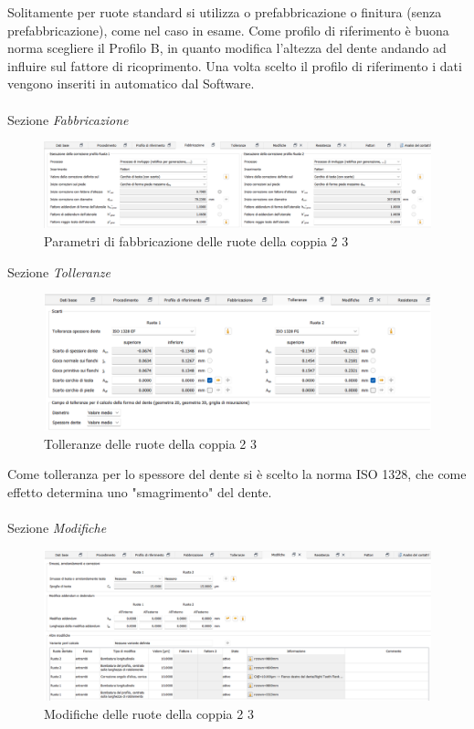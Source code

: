 Solitamente per ruote standard si utilizza o prefabbricazione o finitura (senza prefabbricazione), come nel caso in esame. Come profilo di riferimento è buona norma scegliere il Profilo B, in quanto modifica l’altezza del dente andando ad influire sul fattore di ricoprimento. Una volta scelto il profilo di riferimento i dati vengono inseriti in automatico dal Software.\\
\\
Sezione \emph{Fabbricazione}
\begin{figure}[h]
    \centering
    \includegraphics[scale=0.47]{Immagini/FabbricazioneCoppia23.png}
    \caption{Parametri di fabbricazione delle ruote della coppia 2 3}
    \label{fig:FabbricazioneCoppia23}
\end{figure}
\newpage
Sezione \emph{Tolleranze}
\begin{figure}[h]
    \centering
    \includegraphics[scale=0.47]{Immagini/TolleranzeCoppia23.png}
    \caption{Tolleranze delle ruote della coppia 2 3}
    \label{fig:TolleranzeCoppia23}
\end{figure}

Come tolleranza per lo spessore del dente si è scelto la norma ISO 1328, che come effetto determina uno "smagrimento" del dente.\\
\\
Sezione \emph{Modifiche}
\begin{figure}[h]
    \centering
    \includegraphics[scale=0.47]{Immagini/ModificheCoppia23.png}
    \caption{Modifiche delle ruote della coppia 2 3}
    \label{fig:ModificheCoppia23}
\end{figure}

